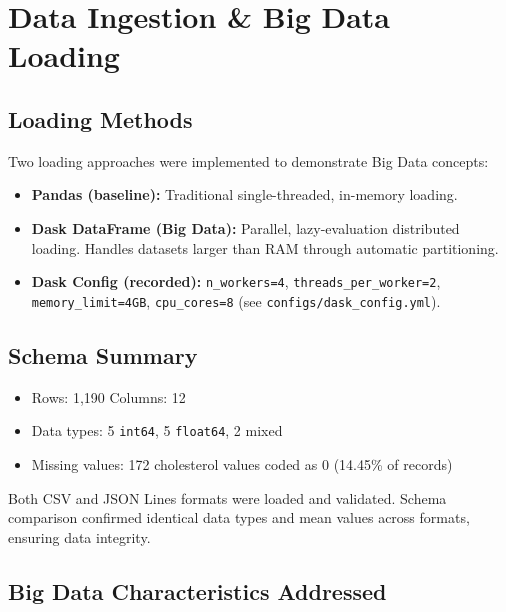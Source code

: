 \documentclass[12pt,a4paper]{article}
\begin{document}
\section{Data Ingestion \& Big Data Loading}

\subsection{Loading Methods}

Two loading approaches were implemented to demonstrate Big Data concepts:

\begin{itemize}
    \item \textbf{Pandas (baseline):} Traditional single-threaded, in-memory loading.
    \item \textbf{Dask DataFrame (Big Data):} Parallel, lazy-evaluation distributed loading. Handles datasets larger than RAM through automatic partitioning.
    \item \textbf{Dask Config (recorded):} \texttt{n\_workers=4}, \texttt{threads\_per\_worker=2}, \texttt{memory\_limit=4GB}, \texttt{cpu\_cores=8} (see \texttt{configs/dask\_config.yml}).
\end{itemize}

\subsection{Schema Summary}

\begin{itemize}
    \item Rows: 1,190 \quad Columns: 12
    \item Data types: 5 \texttt{int64}, 5 \texttt{float64}, 2 mixed
    \item Missing values: 172 cholesterol values coded as 0 (14.45\% of records)
\end{itemize}

Both CSV and JSON Lines formats were loaded and validated. Schema comparison confirmed identical data types and mean values across formats, ensuring data integrity.

\subsection{Big Data Characteristics Addressed}
\end{document}
